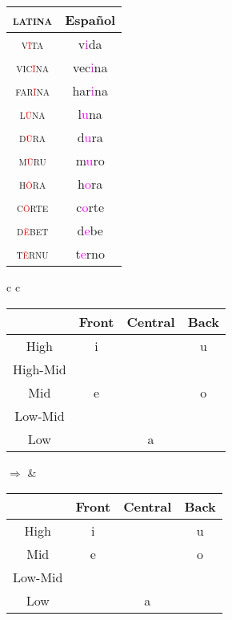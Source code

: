 \documentclass{report}
\begin{document}
\begin{tabular}{c c}
  \textsc{latina} & Español \\
  \hline
  \textsc{v\textcolor{red}{\={i}}ta} & v\textcolor{magenta}{i}da \\
  \textsc{vic\textcolor{red}{\={i}}na} & vec\textcolor{magenta}{i}na \\
  \textsc{far\textcolor{red}{\={i}}na} & har\textcolor{magenta}{i}na \\
  \textsc{l\textcolor{red}{\={u}}na} & l\textcolor{magenta}{u}na \\
  \textsc{d\textcolor{red}{\={u}}ra} & d\textcolor{magenta}{u}ra \\
  \textsc{m\textcolor{red}{\={u}}ru} & m\textcolor{magenta}{u}ro \\
  \textsc{h\textcolor{red}{\={o}}ra} & h\textcolor{magenta}{o}ra \\
  \textsc{c\textcolor{red}{\={o}}rte} & c\textcolor{magenta}{o}rte \\
  \textsc{d\textcolor{red}{\={e}}bet} & d\textcolor{magenta}{e}be \\
  \textsc{t\textcolor{red}{\={e}}rnu} & t\textcolor{magenta}{e}rno \\
\end{tabular}

\begin{tcolorbox}[title=Great Merger, hbox]
  \begin{tabular}{c c}
    \begin{tabular}{|c|c|c|c|}
      \hline
      & Front & Central & Back \\
      \hline
      High & i & & u \\
      \hline
      High-Mid & \cellcolor{gray} \textipa{I} & & \cellcolor{gray} \textipa{U} \\
      \hline
      Mid & e & & o \\
      \hline
      Low-Mid & \textipa{E} & & \textipa{O} \\
      \hline
      Low & & a & \\
      \hline
    \end{tabular}
    \quad $\Rightarrow$ &
                          \begin{tabular}{|c|c|c|c|}
                            \hline
                            & Front & Central & Back \\
                            \hline
                            High & i & & u \\
                            \hline
                            Mid & \cellcolor{magenta} e & & \cellcolor{magenta} o \\
                            \hline
                            Low-Mid & \textipa{E} & & \textipa{O} \\
                            \hline
                            Low & & a & \\
                            \hline
                          \end{tabular}
  \end{tabular}
\end{tcolorbox}
\end{document}
